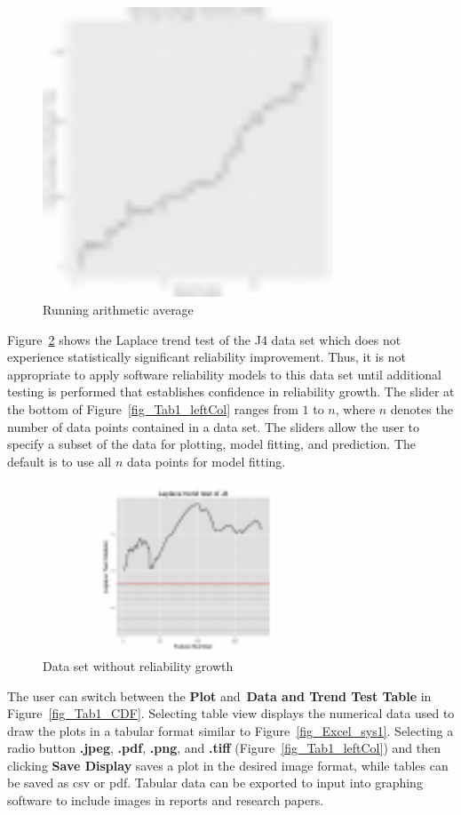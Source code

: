 \documentclass[journal]{IEEEtran}
\begin{document}
\begin{figure}[!h]
\centering
\includegraphics[width=3.4in]{Figures/SRT_RAT}
\caption{Running arithmetic average}
\label{fig_SRT_RAT}
\end{figure}


Figure~\ref{fig:J4Trend} shows the Laplace trend test of the J4 data set which does not experience statistically significant reliability improvement. Thus, it is not appropriate to apply software reliability models to this data set until additional testing is performed that establishes confidence in reliability growth. The slider at the bottom of Figure~\ref{fig_Tab1_leftCol} ranges from $1$ to $n$, where $n$ denotes the number of data points contained in a data set. The sliders allow the user to specify a subset of the data for plotting, model fitting, and prediction. The default is to use all $n$ data points for model fitting.

\begin{figure}[!h]
\centering
\includegraphics[width=3.4in,height=2in]{Figures/J4_Trend_LP}
\caption{Data set without reliability growth}
\label{fig:J4Trend}
\end{figure}

The user can switch between the \textbf{Plot} and~\textbf{Data and Trend Test Table} in Figure~\ref{fig_Tab1_CDF}. Selecting table view displays the numerical data used to draw the plots in a tabular format similar to Figure~\ref{fig_Excel_sys1}. Selecting a radio button \textbf{.jpeg}, \textbf{.pdf}, \textbf{.png}, and \textbf{.tiff} (Figure~\ref{fig_Tab1_leftCol}) and then clicking \textbf{Save Display} saves a plot in the desired image format, while tables can be saved as csv or pdf. Tabular data can be exported to input into graphing software to include images in reports and research papers.
\end{document}
